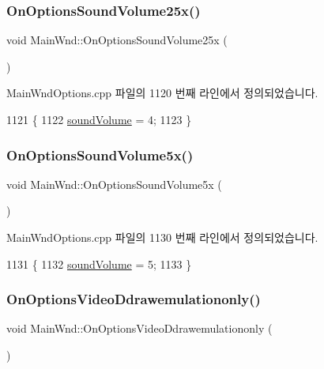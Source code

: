 \subsubsection{\texorpdfstring{On\+Options\+Sound\+Volume25x()}{OnOptionsSoundVolume25x()}}
{\footnotesize\ttfamily void Main\+Wnd\+::\+On\+Options\+Sound\+Volume25x (\begin{DoxyParamCaption}{ }\end{DoxyParamCaption})\hspace{0.3cm}{\ttfamily [protected]}}



Main\+Wnd\+Options.\+cpp 파일의 1120 번째 라인에서 정의되었습니다.


\begin{DoxyCode}
1121 \{
1122   \mbox{\hyperlink{gb_sound_8cpp_a44346dfa73de6666c4727594bb20f6b7}{soundVolume}} = 4;
1123 \}
\end{DoxyCode}
\mbox{\label{class_main_wnd_a1f06aa4d5d0a115db396574ec2fc7f02}} 
\subsubsection{\texorpdfstring{On\+Options\+Sound\+Volume5x()}{OnOptionsSoundVolume5x()}}
{\footnotesize\ttfamily void Main\+Wnd\+::\+On\+Options\+Sound\+Volume5x (\begin{DoxyParamCaption}{ }\end{DoxyParamCaption})\hspace{0.3cm}{\ttfamily [protected]}}



Main\+Wnd\+Options.\+cpp 파일의 1130 번째 라인에서 정의되었습니다.


\begin{DoxyCode}
1131 \{
1132   \mbox{\hyperlink{gb_sound_8cpp_a44346dfa73de6666c4727594bb20f6b7}{soundVolume}} = 5;
1133 \}
\end{DoxyCode}
\mbox{\label{class_main_wnd_a69c7fd2297cf789a4d25ffd6099776e6}} 
\subsubsection{\texorpdfstring{On\+Options\+Video\+Ddrawemulationonly()}{OnOptionsVideoDdrawemulationonly()}}
{\footnotesize\ttfamily void Main\+Wnd\+::\+On\+Options\+Video\+Ddrawemulationonly (\begin{DoxyParamCaption}{ }\end{DoxyParamCaption})\hspace{0.3cm}{\ttfamily [protected]}}



